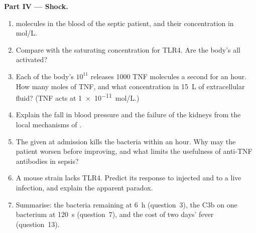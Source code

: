 \begin{problem}
\medskip
\noindent\textbf{Part IV --- Shock.}
\begin{enumerate}[resume]
  \item {} molecules in the blood of the septic
        patient, and their concentration in mol/L.
  \item Compare with the saturating concentration for TLR4. Are the
        body's  all activated?
  \item Each of the body's $10^{11}$  releases \num{1000} TNF
        molecules a second for an hour. How many moles of TNF, and what
        concentration in \qty{15}{L} of extracellular fluid? (TNF acts
        at \qty{1e-11}{mol/L}.)
  \item Explain the fall in blood pressure and the failure of the
        kidneys from the local mechanisms of .
  \item The  given at admission kills the bacteria within an
        hour. Why may the patient worsen before improving, and what
        limits the usefulness of anti-TNF antibodies in sepsis?
  \item A mouse strain lacks TLR4. Predict its response to injected
         and to a live  infection, and
        explain the apparent paradox.
  \item Summarise: the bacteria remaining at \qty{6}{h} (question~3),
        the C3b on one bacterium at \qty{120}{s} (question~7), and the
        cost of two days' fever (question~13).
\end{enumerate}
\end{problem}

